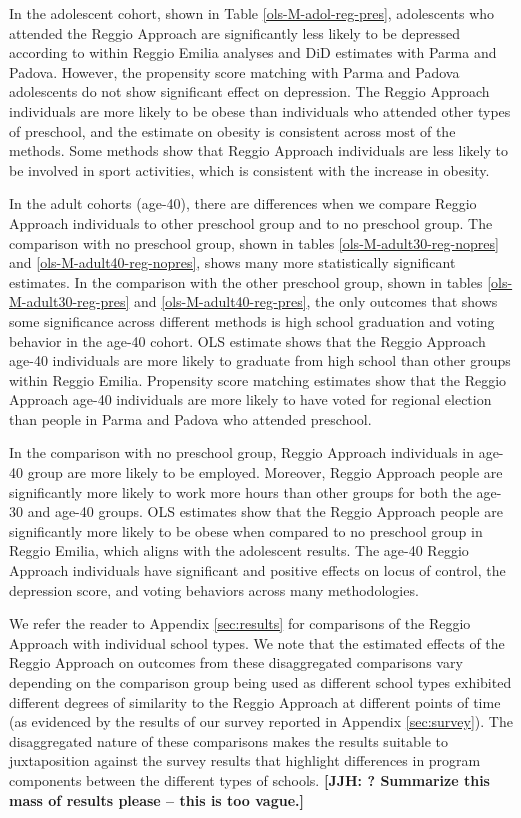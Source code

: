 In the adolescent cohort, shown in Table \ref{ols-M-adol-reg-pres}, adolescents who attended the Reggio Approach are significantly less likely to be depressed according to within Reggio Emilia analyses and DiD estimates with Parma and Padova. However, the propensity score matching with Parma and Padova adolescents do not show significant effect on depression. The Reggio Approach individuals are more likely to be obese than individuals who attended other types of preschool, and the estimate on obesity is consistent across most of the methods. Some methods show that Reggio Approach individuals are less likely to be involved in sport activities, which is consistent with the increase in obesity.

In the adult cohorts (age-40), there are differences when we compare Reggio Approach individuals to other preschool group and to no preschool group. The comparison with no preschool group, shown in tables \ref{ols-M-adult30-reg-nopres} and \ref{ols-M-adult40-reg-nopres}, shows many more statistically significant estimates. In the comparison with the other preschool group, shown in tables \ref{ols-M-adult30-reg-pres} and \ref{ols-M-adult40-reg-pres}, the only outcomes that shows some significance across different methods is high school graduation and voting behavior in the age-40 cohort. OLS estimate shows that the Reggio Approach age-40 individuals are more likely to graduate from high school than other groups within Reggio Emilia. Propensity score matching estimates show that the Reggio Approach age-40 individuals are more likely to have voted for regional election than people in Parma and Padova who attended preschool.

In the comparison with no preschool group, Reggio Approach individuals in age-40 group are more likely to be employed. Moreover, Reggio Approach people are significantly more likely to work more hours than other groups for both the age-30 and age-40 groups. OLS estimates show that the Reggio Approach people are significantly more likely to be obese when compared to no preschool group in Reggio Emilia, which aligns with the adolescent results. The age-40 Reggio Approach individuals have significant and positive effects on locus of control, the depression score, and voting behaviors across many methodologies.

We refer the reader to Appendix \ref{sec:results} for comparisons of the Reggio Approach with individual school types. We note that the estimated effects of the Reggio Approach on outcomes from these disaggregated comparisons vary depending on the comparison group being used as different school types exhibited different degrees of similarity to the Reggio Approach at different points of time (as evidenced by the results of our survey reported in Appendix \ref{sec:survey}). The disaggregated nature of these comparisons makes the results suitable to juxtaposition against the survey results that highlight differences in program components between the different types of schools. \textbf{[JJH: ? Summarize this mass of results please -- this is too vague.]}

